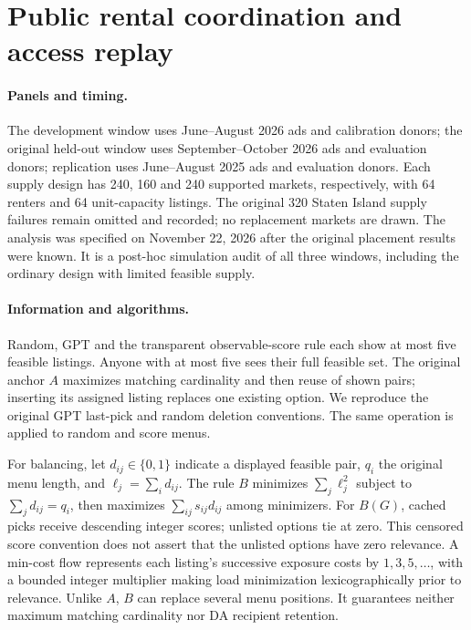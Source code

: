 \section{Public rental coordination and access replay}\label{app:rental-access}
\paragraph{Panels and timing.}
The development window uses June--August 2026 ads and calibration donors;
the original held-out window uses September--October 2026 ads and evaluation
donors; replication uses June--August 2025 ads and evaluation donors.
Each supply design has 240, 160 and 240 supported markets, respectively,
with 64 renters and 64 unit-capacity listings. The original 320 Staten Island
supply failures remain omitted and recorded; no replacement markets are
drawn. The analysis was specified on November 22, 2026 after the original
placement results were known. It is a post-hoc simulation audit of all three
windows, including the ordinary design with limited feasible supply.

\paragraph{Information and algorithms.}
Random, GPT and the transparent observable-score rule each show at most five
feasible listings. Anyone with at most five sees their full feasible set.
The original anchor $A$ maximizes matching cardinality and then reuse of
shown pairs; inserting its assigned listing replaces one existing option.
We reproduce the original GPT last-pick and random deletion conventions.
The same operation is applied to random and score menus.

For balancing, let $d_{ij}\in\{0,1\}$ indicate a displayed feasible pair,
$q_i$ the original menu length, and $\ell_j=\sum_i d_{ij}$.
The rule $B$ minimizes $\sum_j\ell_j^2$ subject to
$\sum_j d_{ij}=q_i$, then maximizes $\sum_{ij}s_{ij}d_{ij}$ among minimizers.
For $B(G)$, cached picks receive descending integer scores; unlisted options
tie at zero. This censored score convention does not assert that the unlisted
options have zero relevance. A min-cost flow represents each listing's
successive exposure costs by $1,3,5,\ldots$, with a bounded integer multiplier
making load minimization lexicographically prior to relevance. Unlike $A$,
$B$ can replace several menu positions. It guarantees neither maximum
matching cardinality nor DA recipient retention.

